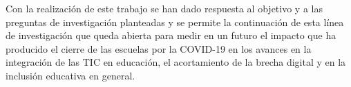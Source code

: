 \documentclass{textolivre}
\begin{document}
Con la realización de este trabajo se han dado respuesta al objetivo y a las preguntas de investigación planteadas y se permite la continuación de esta línea de investigación que queda abierta para medir en un futuro el impacto que ha producido el cierre de las escuelas por la COVID-19 en los avances en la integración de las TIC en educación, el acortamiento de la brecha digital y en la inclusión educativa en general.


\printbibliography\label{sec-bib}
\end{document}
